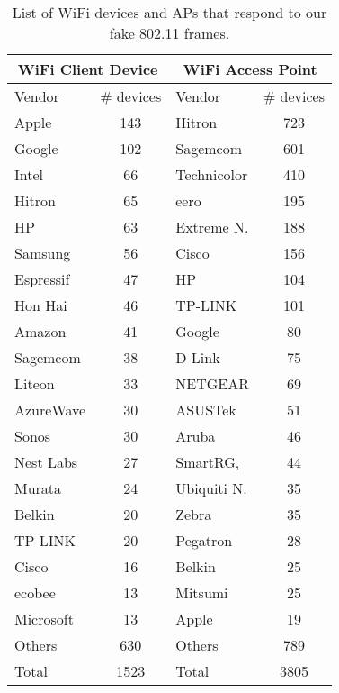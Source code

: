 \begin{table}[t]
    \centering
    \begin{tabular}{|l|c||l|c|}
        \hline
        \multicolumn{2}{|c||}{WiFi Client Device} & \multicolumn{2}{|c|}{WiFi Access Point}\\
        \hline
        Vendor & \# devices &   Vendor & \# devices  \\
        \hline
        Apple&  143	&	Hitron &  723 \\
        Google&  102	&	Sagemcom &  601 \\
        Intel&  66	&	Technicolor&  410 \\
        Hitron &  65	&	eero &  195 \\
        HP &  63	&	Extreme N. &  188 \\
        Samsung&  56	&	Cisco &  156 \\
        Espressif&  47	&	HP &  104 \\
        Hon Hai&  46	&	TP-LINK &  101 \\
        Amazon &  41	&	Google &  80 \\
        Sagemcom &  38	&	D-Link  &  75 \\
        Liteon &  33	&	NETGEAR &  69 \\
        AzureWave &  30	&	ASUSTek  &  51 \\
        Sonos &  30	&	Aruba &  46 \\
        Nest Labs &  27	&	SmartRG, &  44 \\
        Murata  &  24	&	Ubiquiti N.&  35 \\
        Belkin &  20	&	Zebra &  35 \\
        TP-LINK  &  20	&	Pegatron &  28 \\
        Cisco&  16	&	Belkin  &  25 \\
        ecobee &  13	&	Mitsumi &  25 \\
        Microsoft &  13	&	Apple &  19 \\
        Others & 630	&	Others & 789 \\
        \hline\hline	
        Total & 1523	&	Total & 3805  \\
        \hline
    \end{tabular}
    \caption{List of WiFi devices and APs that respond to our fake 802.11 frames.}
    \label{tbl:uncontroled-devices}
\end{table}

